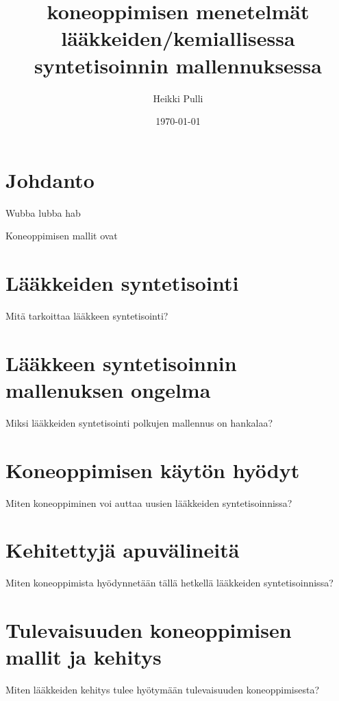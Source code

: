 \documentclass[finnish,twoside,censored,subject,sw-line]{HYthesisML}
\title{koneoppimisen menetelmät lääkkeiden/kemiallisessa syntetisoinnin mallennuksessa}
\author{Heikki Pulli}
\date{\today}
\begin{document}
\maketitle

\newpage
\mytableofcontents
\mainmatter

\chapter{Johdanto}

Wubba lubba hab~\cite{SeglerMarwinHS2018Pcsw}

Koneoppimisen mallit ovat

\chapter{Lääkkeiden syntetisointi}

Mitä tarkoittaa lääkkeen syntetisointi?


\chapter{Lääkkeen syntetisoinnin mallenuksen ongelma}

Miksi lääkkeiden syntetisointi polkujen mallennus on hankalaa?~\cite{ButlerKeithT2018Mlfm}


\chapter{Koneoppimisen käytön hyödyt}

Miten koneoppiminen voi auttaa uusien lääkkeiden syntetisoinnissa?~\cite{VamathevanJessica2019Aoml}

\chapter{Kehitettyjä apuvälineitä}

Miten koneoppimista hyödynnetään tällä hetkellä lääkkeiden syntetisoinnissa? ~\cite{SeglerMarwinHS2018Pcsw,10.1145/3219819.3219882,10.1145/3450439.3451879}

\chapter{Tulevaisuuden koneoppimisen mallit ja kehitys}

Miten lääkkeiden kehitys tulee hyötymään tulevaisuuden koneoppimisesta?~\cite{ButlerKeithT2018Mlfm}

\cleardoublepage                          %
{}  %
\printbibliography

\backmatter
\end{document}
